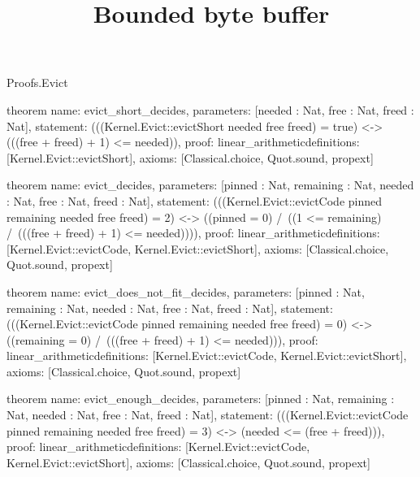 \begin{lexlean}{Proofs.Evict}
\title{Bounded byte buffer}
\begin{semanticmodule}
theorem{
  name: evict_short_decides,
  parameters: [needed : Nat, free : Nat, freed : Nat],
  statement: (((Kernel.Evict::evictShort needed free freed) = true) <-> (((free + freed) + 1) <= needed)),
  proof: linear_arithmetic{definitions: [Kernel.Evict::evictShort]},
  axioms: [Classical.choice, Quot.sound, propext]
}

theorem{
  name: evict_decides,
  parameters: [pinned : Nat, remaining : Nat, needed : Nat, free : Nat, freed : Nat],
  statement: (((Kernel.Evict::evictCode pinned remaining needed free freed) = 2) <-> ((pinned = 0) /\ ((1 <= remaining) /\ (((free + freed) + 1) <= needed)))),
  proof: linear_arithmetic{definitions: [Kernel.Evict::evictCode, Kernel.Evict::evictShort]},
  axioms: [Classical.choice, Quot.sound, propext]
}

theorem{
  name: evict_does_not_fit_decides,
  parameters: [pinned : Nat, remaining : Nat, needed : Nat, free : Nat, freed : Nat],
  statement: (((Kernel.Evict::evictCode pinned remaining needed free freed) = 0) <-> ((remaining = 0) /\ (((free + freed) + 1) <= needed))),
  proof: linear_arithmetic{definitions: [Kernel.Evict::evictCode, Kernel.Evict::evictShort]},
  axioms: [Classical.choice, Quot.sound, propext]
}

theorem{
  name: evict_enough_decides,
  parameters: [pinned : Nat, remaining : Nat, needed : Nat, free : Nat, freed : Nat],
  statement: (((Kernel.Evict::evictCode pinned remaining needed free freed) = 3) <-> (needed <= (free + freed))),
  proof: linear_arithmetic{definitions: [Kernel.Evict::evictCode, Kernel.Evict::evictShort]},
  axioms: [Classical.choice, Quot.sound, propext]
}
\end{semanticmodule}
\end{lexlean}
